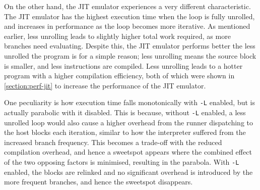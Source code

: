 On the other hand, the JIT emulator experiences a very different characteristic. The JIT emulator has the highest execution time when the loop is fully unrolled, and increases in performance as the loop becomes more iterative. As mentioned earlier, less unrolling leads to slightly higher total work required, as more branches need evaluating. Despite this, the JIT emulator performs better the less unrolled the program is for a simple reason; less unrolling means the source block is smaller, and less instructions are compiled. Less unrolling leads to a hotter program with a higher compilation efficiency, both of which were shown in \autoref{section:perf-jit} to increase the performance of the JIT emulator.

One peculiarity is how execution time falls monotonically with \texttt{-L} enabled, but is actually parabolic with it disabled. This is because, without \texttt{-L} enabled, a less unrolled loop would also cause a higher overhead from the runner dispatching to the host blocks each iteration, similar to how the interpreter suffered from the increased branch frequency. This becomes a trade-off with the reduced compilation overhead, and hence a sweetspot appears where the combined effect of the two opposing factors is minimised, resulting in the parabola. With \texttt{-L} enabled, the blocks are relinked and no significant overhead is introduced by the more frequent branches, and hence the sweetspot disappears. 